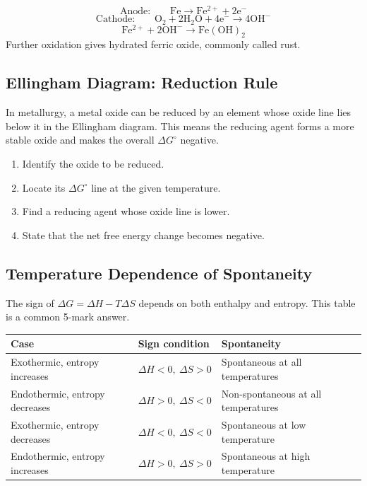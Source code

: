 \documentclass[12pt,a4paper]{article}
\begin{document}
\begin{tcolorbox}[formulabox, title={Rusting Half-Reactions}]
\[
\text{Anode:}\qquad \mathrm{Fe\rightarrow Fe^{2+}+2e^-}
\]
\[
\text{Cathode:}\qquad \mathrm{O_2+2H_2O+4e^-\rightarrow4OH^-}
\]
\[
\mathrm{Fe^{2+}+2OH^-\rightarrow Fe(OH)_2}
\]
Further oxidation gives hydrated ferric oxide, commonly called rust.
\end{tcolorbox}

\subsection{Ellingham Diagram: Reduction Rule}
In metallurgy, a metal oxide can be reduced by an element whose oxide line lies below it in the Ellingham diagram. This means the reducing agent forms a more stable oxide and makes the overall $\Delta G^\circ$ negative.

\begin{tcolorbox}[masonbox, title={Answer-Writing Pattern for Ellingham Problems}]
\begin{enumerate}[leftmargin=*, itemsep=3pt, topsep=2pt]
  \item Identify the oxide to be reduced.
  \item Locate its $\Delta G^\circ$ line at the given temperature.
  \item Find a reducing agent whose oxide line is lower.
  \item State that the net free energy change becomes negative.
\end{enumerate}
\end{tcolorbox}

\subsection{Temperature Dependence of Spontaneity}
The sign of $\Delta G=\Delta H-T\Delta S$ depends on both enthalpy and entropy. This table is a common 5-mark answer.

\begin{tabularx}{\linewidth}{|B{3cm}|Y|Y|}
\hline
\textbf{Case} & \textbf{Sign condition} & \textbf{Spontaneity} \\
\hline
Exothermic, entropy increases & $\Delta H<0,\ \Delta S>0$ & Spontaneous at all temperatures \\
\hline
Endothermic, entropy decreases & $\Delta H>0,\ \Delta S<0$ & Non-spontaneous at all temperatures \\
\hline
Exothermic, entropy decreases & $\Delta H<0,\ \Delta S<0$ & Spontaneous at low temperature \\
\hline
Endothermic, entropy increases & $\Delta H>0,\ \Delta S>0$ & Spontaneous at high temperature \\
\hline
\end{tabularx}
\end{document}
